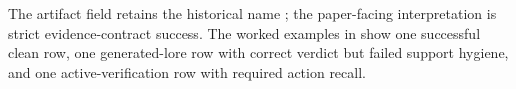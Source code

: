 The artifact field retains the historical name ; the paper-facing interpretation is strict evidence-contract success. The worked examples in  show one successful clean row, one generated-lore row with correct verdict but failed support hygiene, and one active-verification row with required action recall.
